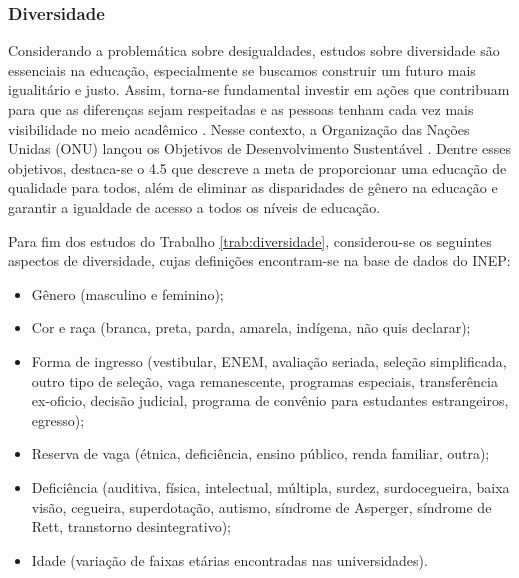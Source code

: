 \documentclass[12pt]{article}
\begin{document}
\subsubsection{Diversidade}
\label{subsubsec:diversidade}
Considerando a problemática sobre desigualdades, estudos sobre diversidade são essenciais na educação, especialmente se buscamos construir um futuro mais igualitário e justo. Assim, torna-se fundamental investir em ações que contribuam para que as diferenças sejam respeitadas e as pessoas tenham cada vez mais visibilidade no meio acadêmico \cite{botella:19}. Nesse contexto, a Organização das Nações Unidas (ONU) lançou os Objetivos de Desenvolvimento Sustentável \cite{NacaoUnida:2023}. Dentre esses objetivos, destaca-se o 4.5 que descreve a meta de proporcionar uma educação de qualidade para todos, além de eliminar as disparidades de gênero na educação e garantir a igualdade de acesso a todos os níveis de educação.



Para fim dos estudos do Trabalho \ref{trab:diversidade}, considerou-se os seguintes aspectos de diversidade, cujas definições encontram-se na base de dados do INEP:

\begin{itemize}
    \item Gênero (masculino e feminino);
    \item Cor e raça (branca, preta, parda, amarela, indígena, não quis declarar);
    \item Forma de ingresso (vestibular, ENEM, avaliação seriada, seleção simplificada, outro tipo de seleção, vaga remanescente, programas especiais, transferência ex-oficio, decisão judicial, programa de convênio para estudantes estrangeiros, egresso);
    \item Reserva de vaga (étnica, deficiência, ensino público, renda familiar, outra);
    \item Deficiência (auditiva, física, intelectual, múltipla, surdez, surdocegueira, baixa visão, cegueira, superdotação, autismo, síndrome de Asperger, síndrome de Rett, transtorno desintegrativo);
    \item Idade (variação de faixas etárias encontradas nas universidades).
\end{itemize}
\end{document}

